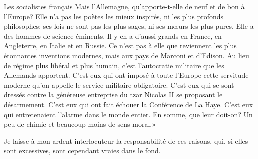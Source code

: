 \begin{chapter}{Les socialistes français}
Mais l'Allemagne, qu'apporte-t-elle de neuf et de bon à l'Europe? Elle
n'a pas les poètes les mieux inspirés, ni les plus profonds philosophes;
ses lois ne sont pas les plus sages, ni ses mœurs les plus pures.
Elle a des hommes de science éminents. Il y en a d'aussi grands en
France, en Angleterre, en Italie et en Russie. Ce n'est pas à elle que
reviennent les plus étonnantes inventions modernes, mais aux pays de
Marconi et d'Edison. Au lieu de régime plus libéral et plus humain,
c'est l'autocratie militaire que les Allemands apportent. C'est eux qui
ont imposé à toute l'Europe cette servitude moderne qu'on appelle le
service militaire obligatoire. C'est eux qui se sont dressés contre la
généreuse entreprise du tzar Nicolas II se proposant le désarmement.
C'est eux qui ont fait échouer la Conférence de La Haye. C'est eux qui
entretenaient l'alarme dans le monde entier. En somme, que leur doit-on?
Un peu de chimie et beaucoup moins de sens moral.»

Je laisse à mon ardent interlocuteur la responsabilité de ces raisons,
qui, si elles sont excessives, sont cependant vraies dans le fond.

\end{chapter}


